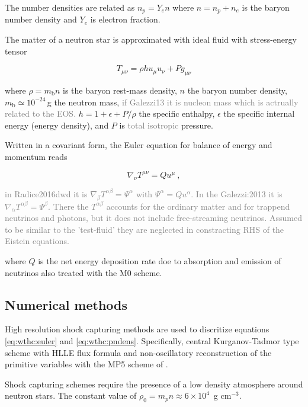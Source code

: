 \documentclass[11pt,a4paper,headinclude=true,DIV=14,BCOR=8mm,chapterprefix,listof=totoc,twoside,openright,abstracton]{scrbook}
\newcommand{\gray}[1]{\textcolor{gray}{#1}}
\newcommand{\gcm}{g cm$^{-3}$}
\begin{document}
The number densities are related as $n_p=Y_e n$ where $n = n_p + n_e$ is the baryon 
number density and $Y_e$ is electron fraction.

The matter of a neutron star is approximated with ideal fluid with stress-energy tensor

\begin{equation}
T_{\mu\nu} = \rho h u_{\mu} u_{\nu} + Pg_{\mu\nu}
\end{equation}

where $\rho=m_{\text{b}} n$ is the baryon rest-mass density, 
$n$ the baryon number density, $m_{\text{b}} \simeq 10^{-24}\,$g 
the neutron mass, 
\gray{if Galezzi13 it is nucleon mass which is actrually related to the EOS.}
$h=1+\epsilon + P/\rho$ the specific enthalpy, 
$\epsilon$ the specific internal energy (energy density),
and $P$ is \gray{total isotropic} pressure.

Written in a covariant form, the Euler equation for balance of energy and momentum reads

\begin{equation}
\label{eq:wthc:euler}
\nabla_\nu T^{\mu\nu} = Q u^{\mu} \ ,
\end{equation}

\gray{in Radice2016dwd it is $\nabla_{\beta}T^{\alpha\beta}=\Psi^{\alpha}$
with $\Psi^{\alpha} = Q u^{\alpha}$.
}
\gray{In the Galezzi:2013 it is $\nabla_{\alpha}T^{\alpha\beta}=\Psi^{\beta}$.
There the $T^{\alpha\beta}$ accounts for the ordinary matter and for trappend neutrinos and photons, but it does not include free-streaming neutrinos. Assumed to be similar to the 'test-fluid' they are neglected in constracting RHS of the Eistein equations.
}

where $Q$ is the net energy deposition rate doe to absorption
and emission of neutrinos also treated with the M0 scheme.
 

\subsection{Numerical methods}


High resolution shock capturing methods are used to discritize equations 
\eqref{eq:wthc:euler} and \eqref{eq:wthc:pndens}.
Specifically, central Kurganov-Tadmor type scheme \cite{Kurganov:2000} with 
HLLE flux formula \cite{Einfeldt:1988}
and non-oscillatory reconstruction of the primitive variables with the MP5 scheme of
\cite{Suresh:1997}.

Shock capturing schemes require the presence of a low density atmosphere around neutron stars.
The constant value of $\rho_0 = m_p n \approx 6\times 10^4$~\gcm.
\end{document}

